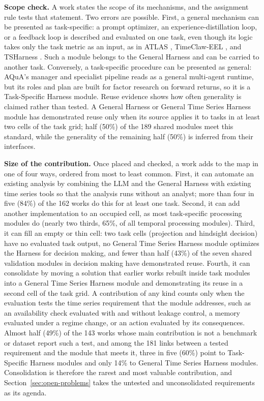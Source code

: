 \documentclass[preprints,article,submit,moreauthors]{Definitions/mdpi}
\begin{document}
\noindent\textbf{Scope check.} A work states the scope of its mechanisms, and the assignment rule tests that statement. Two errors are possible. First, a general mechanism can be presented as task-specific: a prompt optimizer, an experience-distillation loop, or a feedback loop is described and evaluated on one task, even though its logic takes only the task metric as an input, as in ATLAS \citep{atlas2025}, TimeClaw-EEL \citep{timeclaw2026explore}, and TSHarness \citep{tsharness2026}. Such a module belongs to the General Harness and can be carried to another task. Conversely, a task-specific procedure can be presented as general: AQuA's manager and specialist pipeline \citep{aqua2026} reads as a general multi-agent runtime, but its roles and plan are built for factor research on forward returns, so it is a Task-Specific Harness module. Reuse evidence shows how often generality is claimed rather than tested. A General Harness or General Time Series Harness module has demonstrated reuse only when its source applies it to tasks in at least two cells of the task grid; half (50\%) of the 189 shared modules meet this standard, while the generality of the remaining half (50\%) is inferred from their interfaces.

\noindent\textbf{Size of the contribution.} Once placed and checked, a work adds to the map in one of four ways, ordered from most to least common. First, it can automate an existing analysis by combining the LLM and the General Harness with existing time series tools so that the analysis runs without an analyst; more than four in five (84\%) of the 162 works do this for at least one task. Second, it can add another implementation to an occupied cell, as most task-specific processing modules do (nearly two thirds, 65\%, of all temporal processing modules). Third, it can fill an empty or thin cell: two task cells (projection and hindsight decision) have no evaluated task output, no General Time Series Harness module optimizes the Harness for decision making, and fewer than half (43\%) of the seven shared validation modules in decision making have demonstrated reuse. Fourth, it can consolidate by moving a solution that earlier works rebuilt inside task modules into a General Time Series Harness module and demonstrating its reuse in a second cell of the task grid. A contribution of any kind counts only when the evaluation tests the time series requirement that the module addresses, such as an availability check evaluated with and without leakage control, a memory evaluated under a regime change, or an action evaluated by its consequences. Almost half (49\%) of the 143 works whose main contribution is not a benchmark or dataset report such a test, and among the 181 links between a tested requirement and the module that meets it, three in five (60\%) point to Task-Specific Harness modules and only 14\% to General Time Series Harness modules. Consolidation is therefore the rarest and most valuable contribution, and Section~\ref{sec:open-problems} takes the untested and unconsolidated requirements as its agenda.
\end{document}
